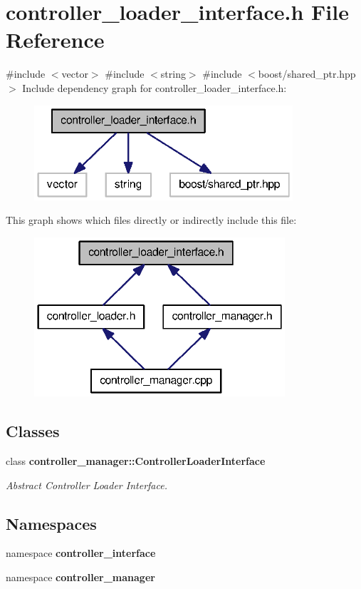 \section{controller\-\_\-loader\-\_\-interface.\-h \-File \-Reference}
\label{controller__loader__interface_8h}
{\ttfamily \#include $<$vector$>$}\*
{\ttfamily \#include $<$string$>$}\*
{\ttfamily \#include $<$boost/shared\-\_\-ptr.\-hpp$>$}\*
\-Include dependency graph for controller\-\_\-loader\-\_\-interface.\-h\-:\nopagebreak
\begin{figure}[H]
\begin{center}
\leavevmode
\includegraphics[width=272pt]{controller__loader__interface_8h__incl}
\end{center}
\end{figure}
\-This graph shows which files directly or indirectly include this file\-:\nopagebreak
\begin{figure}[H]
\begin{center}
\leavevmode
\includegraphics[width=264pt]{controller__loader__interface_8h__dep__incl}
\end{center}
\end{figure}
\subsection*{\-Classes}
\begin{DoxyCompactItemize}
\item 
class {\bf controller\-\_\-manager\-::\-Controller\-Loader\-Interface}
\begin{DoxyCompactList}\small\item\em \-Abstract \-Controller \-Loader \-Interface. \end{DoxyCompactList}\end{DoxyCompactItemize}
\subsection*{\-Namespaces}
\begin{DoxyCompactItemize}
\item 
namespace {\bf controller\-\_\-interface}
\item 
namespace {\bf controller\-\_\-manager}
\end{DoxyCompactItemize}
